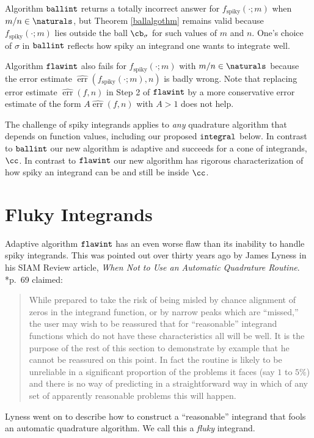 \documentclass[]{article}
\DeclareMathOperator{\integ}{\texttt{\textup{integral}}}
\DeclareMathOperator{\flawinteg}{\texttt{\textup{flawint}}}
\DeclareMathOperator{\ballinteg}{\texttt{\textup{ballint}}}
\DeclareMathOperator{\err}{err}
\newcommand{\herr}{\widehat{\err}}
\theoremstyle{definition}
\theoremstyle{remark}
\begin{document}
Algorithm $\ballinteg$ returns a totally incorrect answer for $f_{\text{spiky}}(\cdot;m)$ when $m/n \in \naturals$, but Theorem \ref{ballalgothm} remains valid because $f_{\text{spiky}}(\cdot;m)$ lies outside the ball $\cb_{\sigma}$ for such values of $m$ and $n$.  One's choice of $\sigma$ in $\ballinteg$ reflects how spiky an integrand one wants to integrate well.

Algorithm $\flawinteg$ also fails for $f_{\text{spiky}}(\cdot;m)$ with $m/n \in \naturals$ because the error estimate $\herr(f_{\text{spiky}}(\cdot;m),n)$ is badly wrong. Note that replacing error estimate $\herr(f,n)$ in Step 2 of $\flawinteg$ by a more conservative error estimate of the form $A\herr(f,n)$ with $A>1$ does not help.

The challenge of spiky integrands applies to \emph{any} quadrature algorithm that depends on function values, including our proposed $\integ$ below.  In contrast to $\ballinteg$ our new algorithm is adaptive and succeeds for a cone of integrands, $\cc$.  In contrast to $\flawinteg$ our new algorithm has rigorous characterization of how spiky an integrand can be and still be inside $\cc$.


\section{Fluky Integrands} \label{flukysubsec}

Adaptive algorithm $\flawinteg$ has an even worse flaw than its inability to handle spiky integrands.  This was pointed out over thirty years ago by James Lyness in his SIAM Review article, \emph{When Not to Use an Automatic Quadrature Routine}.  *{p.\ 69} claimed:
\begin{quote}
While prepared to take the risk of being misled by chance alignment of zeros in the integrand function, or by narrow peaks which are ``missed,'' the user may wish to be reassured that for ``reasonable'' integrand functions which do not have these characteristics all will be well. It is the purpose of the rest of this section to demonstrate by example that he cannot be reassured on this point. In fact the routine is likely to be unreliable in a significant proportion of the problems it faces (say $1$ to $5\%$) and there is no way of predicting in a straightforward way in which of any set of apparently reasonable problems this will happen.
\end{quote}
Lyness went on to describe how to construct a ``reasonable'' integrand that fools an automatic quadrature algorithm.  We call this a \emph{fluky} integrand.  
\end{document}
